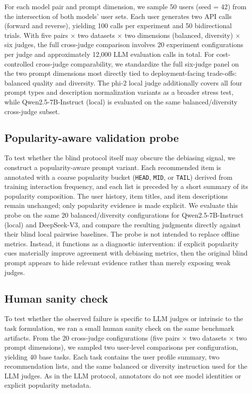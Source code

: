 \documentclass[pdflatex,sn-basic,referee,lineno]{sn-jnl}
\begin{document}
For each model pair and prompt dimension, we sample 50 users (seed = 42) from the intersection of both models' user sets. Each user generates two API calls (forward and reverse), yielding 100 calls per experiment and 50 bidirectional trials. With five pairs $\times$ two datasets $\times$ two dimensions (balanced, diversity) $\times$ six judges, the full cross-judge comparison involves 20 experiment configurations per judge and approximately 12,000 LLM evaluation calls in total. For cost-controlled cross-judge comparability, we standardize the full six-judge panel on the two prompt dimensions most directly tied to deployment-facing trade-offs: balanced quality and diversity. The phi-2 local judge additionally covers all four prompt types and description normalization variants as a broader stress test, while Qwen2.5-7B-Instruct (local) is evaluated on the same balanced/diversity cross-judge subset.

\subsection{Popularity-aware validation probe}

To test whether the blind protocol itself may obscure the debiasing signal, we construct a popularity-aware prompt variant. Each recommended item is annotated with a coarse popularity bucket (\texttt{HEAD}, \texttt{MID}, or \texttt{TAIL}) derived from training interaction frequency, and each list is preceded by a short summary of its popularity composition. The user history, item titles, and item descriptions remain unchanged; only popularity evidence is made explicit. We evaluate this probe on the same 20 balanced/diversity configurations for Qwen2.5-7B-Instruct (local) and DeepSeek-V3, and compare the resulting judgments directly against their blind local pairwise baselines. The probe is not intended to replace offline metrics. Instead, it functions as a diagnostic intervention: if explicit popularity cues materially improve agreement with debiasing metrics, then the original blind prompt appears to hide relevant evidence rather than merely exposing weak judges.

\subsection{Human sanity check}
\label{sec:human_sanity}

To test whether the observed failure is specific to LLM judges or intrinsic to the task formulation, we ran a small human sanity check on the same benchmark artifacts. From the 20 cross-judge configurations (five pairs $\times$ two datasets $\times$ two prompt dimensions), we sampled two user-level comparisons per configuration, yielding 40 base tasks. Each task contains the user profile summary, two recommendation lists, and the same balanced or diversity instruction used for the LLM judges. As in the LLM protocol, annotators do not see model identities or explicit popularity metadata.
\end{document}
